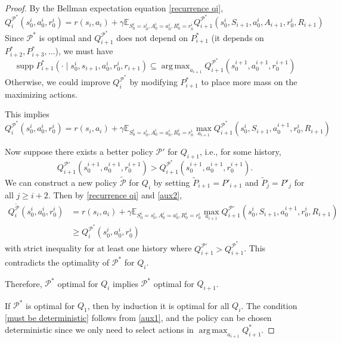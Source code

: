 \documentclass[a4paper, 11pt]{article}
\numberwithin{equation}{section}
\theoremstyle{plain}
\theoremstyle{definition}
\newcommand{\E}{{\mathbb E}}
\newcommand{\1}{{\mathbbm 1}}
\newcommand{\mc}[1]{\mathcal{#1}}
\DeclareMathOperator*{\argmax}{arg\,max}
\DeclareMathOperator*{\supp}{supp}
\begin{document}
	\begin{proof}
		By the Bellman expectation equation \eqref{recurrence qi},
		\begin{equation}\label{a}
			Q_i^{\mc{P}^*}(s_0^i, a_0^{i }, r_0^i) = r(s_i, a_i) + \gamma\E_{S_0^i = s_0^i, A_0^{i} = a_0^{i}, R_0^i = r_0^i} Q_{i + 1}^{\mc{P}^*}(s_0^{i}, S_{i + 1}, a_0^{i}, A_{i + 1}, r_0^{i}, R_{i + 1})
		\end{equation}
		Since $\mc{P}^*$ is optimal and $Q_{i + 1}^{\mc{P}^*}$ does not depend on $P^*_{i + 1}$ (it depends on $P^*_{i+2}, P^*_{i+3}, \ldots$), we must have
		\begin{equation}\label{aux1}
			\supp P^*_{i + 1}(\cdot\;|\; s_0^i, s_{i + 1}, a_0^i, r_0^i, r_{i + 1}) \subseteq   \argmax_{a_{i + 1}} Q_{i + 1}^{\mc{P}^*}(s_0^{i + 1}, a_0^{i + 1}, r_0^{i + 1})
		\end{equation} 
		Otherwise, we could improve $Q_i^{\mc{P}^*}$ by modifying $P^*_{i+1}$ to place more mass on the maximizing actions.
		
		This implies
		\begin{equation}\label{aux2}
			Q_i^{\mc{P}^*}(s_0^i, a_0^{i }, r_0^i) = r(s_i, a_i) + \gamma\E_{S_0^i = s_0^i, A_0^{i} = a_0^{i}, R_0^i = r_0^i} \max_{a_{i + 1}} Q_{i + 1}^{\mc{P}^*}(s_0^{i}, S_{i + 1}, a_0^{i + 1}, r_0^{i}, R_{i + 1})
		\end{equation} 
		
		Now suppose there exists a better policy $\mc{P}'$ for $Q_{i + 1}$, i.e., for some history,
		\begin{equation*}
			Q_{i+1}^{\mc{P}'}(s_0^{i+1}, a_0^{i+1}, r_0^{i+1}) > Q_{i+1}^{\mc{P}^*}(s_0^{i+1}, a_0^{i+1}, r_0^{i+1}).
		\end{equation*}
		We can construct a new policy $\tilde{\mc{P}}$ for $Q_i$ by setting $\tilde{P}_{i+1} = P'_{i+1}$ and $\tilde{P}_j = P'_j$ for all $j \geq i+2$. Then by \eqref{recurrence qi} and \eqref{aux2},
		\begin{equation*}
			\begin{split}
				Q_i^{\tilde{\mc{P}}}(s_0^i, a_0^{i }, r_0^i) &= r(s_i, a_i) + \gamma\E_{S_0^i = s_0^i, A_0^{i} = a_0^{i}, R_0^i = r_0^i} \max_{a_{i + 1}} Q_{i + 1}^{\mc{P}'}(s_0^{i}, S_{i + 1}, a_0^{i + 1}, r_0^{i}, R_{i + 1})\\
				&\geq Q_i^{\mc{P}^*}(s_0^i, a_0^{i }, r_0^i)
			\end{split}
		\end{equation*}
		with strict inequality for at least one history where $Q_{i+1}^{\mc{P}'} > Q_{i+1}^{\mc{P}^*}$. This contradicts the optimality of $\mc{P}^*$ for $Q_i$.
		
		Therefore, $\mc{P}^*$ optimal for $Q_i$ implies $\mc{P}^*$ optimal for $Q_{i+1}$.
		
		If $\mc{P}^*$ is optimal for $Q_1$, then by induction it is optimal for all $Q_i$. The condition \eqref{must be deterministic} follows from \eqref{aux1}, and the policy can be chosen deterministic since we only need to select actions in $\argmax_{a_{i+1}} Q_{i+1}^*$.
	\end{proof}
	
\end{document}
